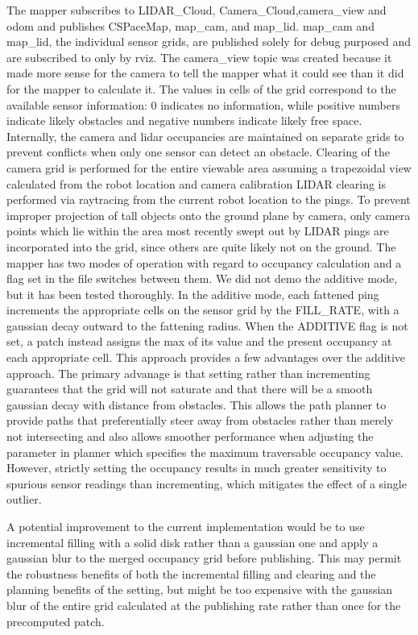 \documentclass{article}
\begin{document}
The mapper subscribes to LIDAR\_Cloud, Camera\_Cloud,camera\_view and odom and publishes CSPaceMap, map\_cam, and map\_lid.  
map\_cam and map\_lid, the individual sensor grids, are published solely for debug purposed and are subscribed to only by rviz.
The camera\_view topic was created because it made more sense for the camera to tell the mapper what it could see than it did for the mapper to calculate it.
The values in cells of the grid correspond to the available sensor information: 0 indicates no information, while positive numbers indicate likely obstacles and negative numbers indicate likely free space.
Internally, the camera and lidar occupancies are maintained on separate grids to prevent conflicts when only one sensor can detect an obstacle.
Clearing of the camera grid is performed for the entire viewable area assuming a trapezoidal view calculated from the robot location and camera calibration
LIDAR clearing is performed via raytracing from the current robot location to the pings.
To prevent improper projection of tall objects onto the ground plane by camera, only camera points which lie within the area most recently swept out by LIDAR pings are incorporated into the grid, since others are quite likely not on the ground.
The mapper has two modes of operation with regard to occupancy calculation and a flag set in the file switches between them.
We did not demo the additive mode, but it has been tested thoroughly.  
In the additive mode, each fattened ping increments the appropriate cells on the sensor grid by the FILL\_RATE, with a gaussian decay outward to the fattening radius.  
When the ADDITIVE flag is not set, a patch instead assigns the max of its value and the present occupancy at each appropriate cell.  
This approach provides a few advantages over the additive approach.  
The primary advanage is that setting rather than incrementing guarantees that the grid will not saturate and that there will be a smooth gaussian decay with distance from obstacles.  
This allows the path planner to provide paths that preferentially steer away from obstacles rather than merely not intersecting and also allows smoother performance when adjusting the parameter in planner which specifies the maximum traversable occupancy value.  
However, strictly setting the occupancy results in much greater sensitivity to spurious sensor readings than incrementing, which mitigates the effect of a single outlier.

A potential improvement to the current implementation would be to use incremental filling with a solid disk rather than a gaussian one and apply a gaussian blur to the merged occupancy grid before publishing.  
This may permit the robustness benefits of both the incremental filling and clearing and the planning benefits of the setting, but might be too expensive with the gaussian blur of the entire grid calculated at the publishing rate rather than once for the precomputed patch.
\end{document}
